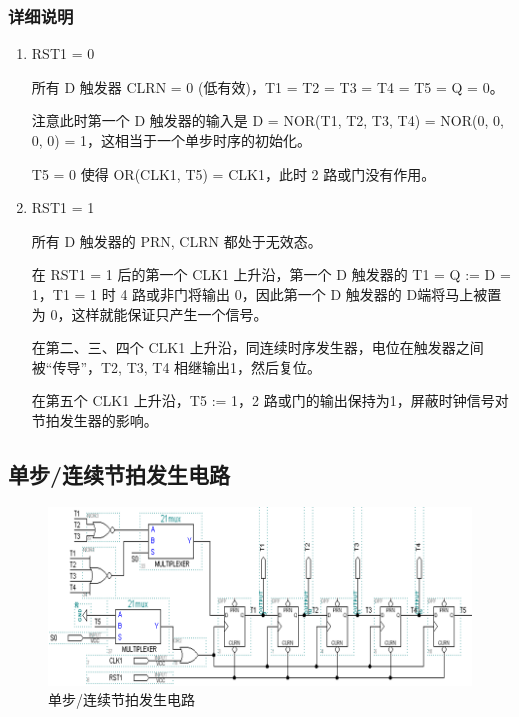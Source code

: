\subsubsection{详细说明}

\begin{enumerate}
    \item RST1 = 0
    
    所有 D 触发器 CLRN = 0 (低有效)，T1 = T2 = T3 = T4 = T5 = Q = 0。
    
    注意此时第一个 D 触发器的输入是 D = NOR(T1, T2, T3, T4) = NOR(0, 0, 0, 0) = 1，这相当于一个单步时序的初始化。
    
    T5 = 0 使得 OR(CLK1, T5) = CLK1，此时 2 路或门没有作用。
    
    \item RST1 = 1
    
    所有 D 触发器的 PRN, CLRN 都处于无效态。
    
    在 RST1 = 1 后的第一个 CLK1 上升沿，第一个 D 触发器的 T1 = Q := D = 1，T1 = 1 时 4 路或非门将输出 0，因此第一个 D 触发器的 D端将马上被置为 0，这样就能保证只产生一个信号。
    
    在第二、三、四个 CLK1 上升沿，同连续时序发生器，电位在触发器之间被“传导”，T2, T3, T4 相继输出1，然后复位。
    
    在第五个 CLK1 上升沿，T5 := 1，2 路或门的输出保持为1，屏蔽时钟信号对节拍发生器的影响。
        
\end{enumerate}

\subsection{单步/连续节拍发生电路}


\begin{figure}[H]
\centering
\includegraphics[width=\textwidth]{images/prin1_3.png}
\caption{单步/连续节拍发生电路}
\label{fig:prin1_3}
\end{figure}

